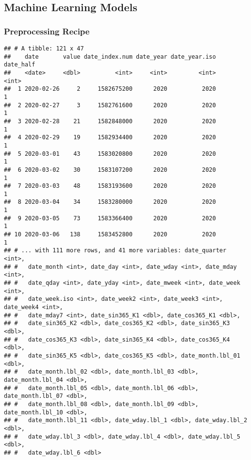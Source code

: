 \documentclass[
]{article}
\begin{document}
\hypertarget{machine-learning-models-1}{%
\subsection{Machine Learning Models}\label{machine-learning-models-1}}

\hypertarget{preprocessing-recipe-1}{%
\subsubsection{Preprocessing Recipe}\label{preprocessing-recipe-1}}

\begin{verbatim}
## # A tibble: 121 x 47
##    date       value date_index.num date_year date_year.iso date_half
##    <date>     <dbl>          <int>     <int>         <int>     <int>
##  1 2020-02-26     2     1582675200      2020          2020         1
##  2 2020-02-27     3     1582761600      2020          2020         1
##  3 2020-02-28    21     1582848000      2020          2020         1
##  4 2020-02-29    19     1582934400      2020          2020         1
##  5 2020-03-01    43     1583020800      2020          2020         1
##  6 2020-03-02    30     1583107200      2020          2020         1
##  7 2020-03-03    48     1583193600      2020          2020         1
##  8 2020-03-04    34     1583280000      2020          2020         1
##  9 2020-03-05    73     1583366400      2020          2020         1
## 10 2020-03-06   138     1583452800      2020          2020         1
## # ... with 111 more rows, and 41 more variables: date_quarter <int>,
## #   date_month <int>, date_day <int>, date_wday <int>, date_mday <int>,
## #   date_qday <int>, date_yday <int>, date_mweek <int>, date_week <int>,
## #   date_week.iso <int>, date_week2 <int>, date_week3 <int>, date_week4 <int>,
## #   date_mday7 <int>, date_sin365_K1 <dbl>, date_cos365_K1 <dbl>,
## #   date_sin365_K2 <dbl>, date_cos365_K2 <dbl>, date_sin365_K3 <dbl>,
## #   date_cos365_K3 <dbl>, date_sin365_K4 <dbl>, date_cos365_K4 <dbl>,
## #   date_sin365_K5 <dbl>, date_cos365_K5 <dbl>, date_month.lbl_01 <dbl>,
## #   date_month.lbl_02 <dbl>, date_month.lbl_03 <dbl>, date_month.lbl_04 <dbl>,
## #   date_month.lbl_05 <dbl>, date_month.lbl_06 <dbl>, date_month.lbl_07 <dbl>,
## #   date_month.lbl_08 <dbl>, date_month.lbl_09 <dbl>, date_month.lbl_10 <dbl>,
## #   date_month.lbl_11 <dbl>, date_wday.lbl_1 <dbl>, date_wday.lbl_2 <dbl>,
## #   date_wday.lbl_3 <dbl>, date_wday.lbl_4 <dbl>, date_wday.lbl_5 <dbl>,
## #   date_wday.lbl_6 <dbl>
\end{verbatim}
\end{document}
